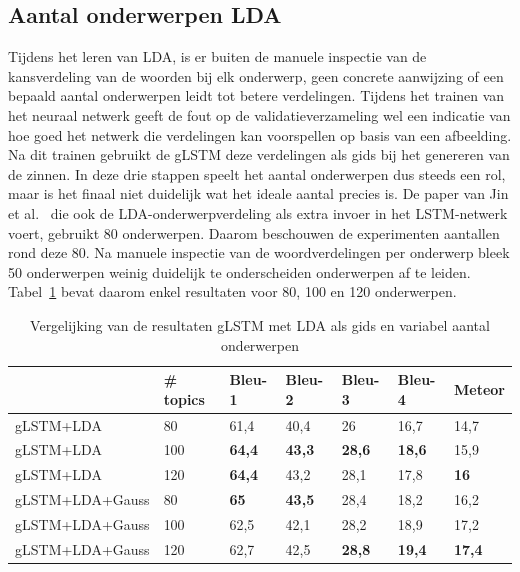\subsection{Aantal onderwerpen LDA}
Tijdens het leren van LDA, is er buiten de manuele inspectie van de kansverdeling van de woorden bij elk onderwerp, geen concrete aanwijzing of een bepaald aantal onderwerpen leidt tot betere verdelingen.
Tijdens het trainen van het neuraal netwerk geeft de fout op de validatieverzameling wel een indicatie van hoe goed het netwerk die verdelingen kan voorspellen op basis van een afbeelding.
Na dit trainen gebruikt de gLSTM deze verdelingen als gids bij het genereren van de zinnen.
In deze drie stappen speelt het aantal onderwerpen dus steeds een rol, maar is het finaal niet duidelijk wat het ideale aantal precies is.
De paper van Jin et al.~\cite{Jin2015} die ook de LDA-onderwerpverdeling als extra invoer in het LSTM-netwerk voert, gebruikt 80 onderwerpen.
Daarom beschouwen de experimenten aantallen rond deze 80. Na manuele inspectie van de woordverdelingen per onderwerp bleek 50 onderwerpen weinig duidelijk te onderscheiden onderwerpen af te leiden.
Tabel~\ref{table:lda-onderwerpen} bevat daarom enkel resultaten voor 80, 100 en 120 onderwerpen.

    \begin{table}
    	\centering
    	\begin{tabular}{lllllll}
    		~                 &\# topics  & Bleu-1 & Bleu-2 & Bleu-3 & Bleu-4 & Meteor \\ \hline
    		gLSTM+LDA       & 80  & 61,4   & 40,4  & 26   & 16,7   & 14,7     \\ 
    		gLSTM+LDA      & 100  & \textbf{64,4}   & \textbf{43,3}   & \textbf{28,6}   & \textbf{18,6}   & 15,9  \\
    		gLSTM+LDA      &120   & \textbf{64,4}   & 43,2   & 28,1   & 17,8   & \textbf{16}  \\\hline
    		gLSTM+LDA+Gauss &80 & \textbf{65}   & \textbf{43,5}   & 28,4   & 18,2   & 16,2  \\ 
    		gLSTM+LDA+Gauss& 100&62,5& 42,1   & 28,2   & 18,9   & 17,2    \\
    	gLSTM+LDA+Gauss&120 & 62,7   & 42,5   &\textbf{28,8}   & \textbf{19,4}   & \textbf{17,4}  \\\hline
    	\end{tabular}
    	\caption{Vergelijking van de resultaten gLSTM met LDA als gids en variabel aantal onderwerpen}	
    	\label{table:lda-onderwerpen}
    \end{table}
    
